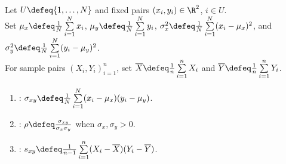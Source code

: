 \begin{definition} \label{def:finite-population-covariance-correlation} \\
Let $U\defeq\{1,\ldots,N\}$ and fixed pairs $(x_i,y_i)\in\R^2$, $i\in U$.\\
Set $\mu_x\defeq \frac{1}{N}\sum\limits_{i=1}^{N}x_i$, $\mu_y\defeq \frac{1}{N}\sum\limits_{i=1}^{N}y_i$, $\sigma_x^2\defeq \frac{1}{N}\sum\limits_{i=1}^{N}(x_i-\mu_x)^2$, and $\sigma_y^2\defeq \frac{1}{N}\sum\limits_{i=1}^{N}(y_i-\mu_y)^2$.\\
For sample pairs $(X_i,Y_i)_{i=1}^{n}$, set $\overline{X}\defeq \frac{1}{n}\sum\limits_{i=1}^{n}X_i$ and $\overline{Y}\defeq \frac{1}{n}\sum\limits_{i=1}^{n}Y_i$.
\begin{enumerate}[label=(\roman*)]
\setlength{\itemsep}{0pt}
\item {}: $\sigma_{xy}\defeq \frac{1}{N}\sum\limits_{i=1}^{N}(x_i-\mu_x)(y_i-\mu_y)$.
\item {}: $\rho\defeq\frac{\sigma_{xy}}{\sigma_x\sigma_y}$ when $\sigma_x,\sigma_y>0$.
\item {}: $s_{xy}\defeq \frac{1}{n-1}\sum\limits_{i=1}^{n}(X_i-\overline{X})(Y_i-\overline{Y})$.
\end{enumerate}
\end{definition}

